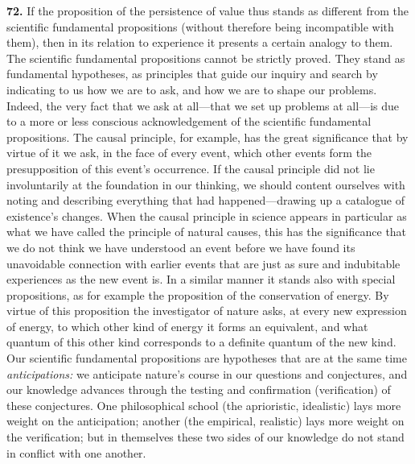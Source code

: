 \documentclass[12pt,a4paper]{book}
\newcommand{\opage}[1]{\marginnote{\footnotesize\textit{[#1]}}}
\begin{document}
\medskip

\noindent\textbf{72.} If the proposition of the persistence of value thus stands as different
from the scientific fundamental propositions (without therefore being incompatible with them),
then in its relation to experience it presents a certain analogy to them. The scientific
fundamental propositions cannot be strictly proved. They stand as fundamental hypotheses, as
principles that guide our inquiry and search by indicating to us how we are to ask, and how we are
to shape our problems. Indeed, the very fact that we ask at all---that we set up problems at
all---is due to a more or less conscious acknowledgement of the scientific fundamental
propositions. The causal principle, for example, has the great significance that by virtue of it
we ask, in the face of every event, which other events form the presupposition of this event's
occurrence. If the causal principle did not lie involuntarily at the foundation in our thinking, we
should content ourselves with noting and describing everything that had happened---drawing up a
catalogue of existence's changes. When the causal principle in science appears in particular as
what we have called the principle of natural causes, this has the significance that we do not think
we have understood an event before we have found its unavoidable connection with 
\opage{167}earlier events
that are just as sure and indubitable experiences as the new event is. In a similar manner it
stands also with special propositions, as for example the proposition of the conservation of
energy. By virtue of this proposition the investigator of nature asks, at every new expression of
energy, to which other kind of energy it forms an equivalent, and what quantum of this other kind
corresponds to a definite quantum of the new kind. Our scientific fundamental propositions are
hypotheses that are at the same time \emph{anticipations:} we anticipate nature's course in our
questions and conjectures, and our knowledge advances through the testing and confirmation
(verification) of these conjectures. One philosophical school (the aprioristic, idealistic) lays
more weight on the anticipation; another (the empirical, realistic) lays more weight on the
verification; but in themselves these two sides of our knowledge do not stand in conflict with one
another.
\end{document}
